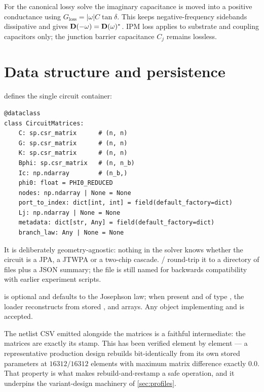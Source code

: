 For the canonical lossy solve the imaginary capacitance is moved into a
positive conductance using $G_{\mathrm{loss}}=|\omega|C\tan\delta$. This keeps
negative-frequency sidebands dissipative and gives
$\mathbf{D}(-\omega)=\mathbf{D}(\omega)^*$. IPM loss applies to substrate and coupling
capacitors only; the junction barrier capacitance $C_j$ remains lossless.

\section{Data structure and persistence}

\begin{implnote}
 defines the single circuit container:
\begin{lstlisting}
@dataclass
class CircuitMatrices:
    C: sp.csr_matrix      # (n, n)
    G: sp.csr_matrix      # (n, n)
    K: sp.csr_matrix      # (n, n)
    Bphi: sp.csr_matrix   # (n, n_b)
    Ic: np.ndarray        # (n_b,)
    phi0: float = PHI0_REDUCED
    nodes: np.ndarray | None = None
    port_to_index: dict[int, int] = field(default_factory=dict)
    Lj: np.ndarray | None = None
    metadata: dict[str, Any] = field(default_factory=dict)
    branch_law: Any | None = None
\end{lstlisting}
It is deliberately geometry-agnostic: nothing in the solver knows whether the
circuit is a JPA, a JTWPA or a two-chip cascade.  /
 round-trip it to a directory of  files plus a
JSON summary; the file is still named  for backwards
compatibility with earlier experiment scripts.

 is optional and defaults to the Josephson law; when present
and of type , the loader reconstructs
 from stored ,
 and  arrays. Any object implementing
 and  is accepted.
\end{implnote}

The netlist CSV emitted alongside the matrices is a faithful intermediate: the
matrices are exactly its stamp. This has been verified element by element --- a
representative production design rebuilds bit-identically from its own stored
parameters at $16312/16312$ elements with maximum matrix difference exactly
$0.0$. That property is what makes rebuild-and-restamp a safe operation, and it
underpins the variant-design machinery of \cref{sec:profiles}.

